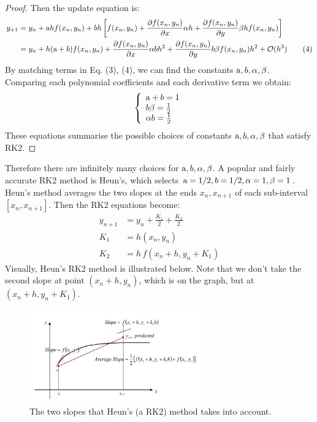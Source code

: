 \documentclass[a4paper]{article}
\begin{document}
\begin{proof}
Then the update equation is:
\begin{align*}
    y_{+1} &= y_n + \textup{a} h f(x_n, y_n) + b h \left[ f(x_n, y_n) + \frac{\partial f(x_n, y_n)}{\partial x} \alpha h + \frac{\partial f(x_n, y_n)}{\partial y} \beta h f(x_n, y_n) \right] \\
    &= y_n + h(\textup{a} + b) f(x_n, y_n) + \frac{\partial f(x_n, y_n)}{\partial x} \alpha b h^2 + \frac{\partial f(x_n, y_n)}{\partial y} b \beta f(x_n, y_n) h^2 + \mathcal{O}(h^3)
    \tag{4}
\end{align*}
By matching terms in Eq. (3), (4), we can find the constants $\textup{a}, b, \alpha, \beta$. Comparing each polynomial coefficients and each derivative term we obtain:
\[
    \left \{
        \begin{array}{l}
            \textup{a} + b = 1 \\
            b \beta = \frac{1}{2} \\
            \alpha b = \frac{1}{2}
        \end{array}
    \right.
\]
These equations summarise the possible choices of constants $\textup{a}, b, \alpha, \beta$ that satisfy RK2.
\end{proof}
Therefore there are infinitely many choices for $\textup{a}, b, \alpha, \beta$. A popular and fairly accurate RK2 method is Heun's, which selects $\textup{a} = 1/2, b=1/2, \alpha = 1, \beta = 1$. Heun's method averages the two slopes at the ends $x_n, x_{n+1}$ of each sub-interval $[x_n, x_{n+1}]$. Then the RK2 equations become:
\begin{align*}
    y_{n+1} &= y_n + \frac{K_1}{2} + \frac{K_2}{2} \\
    K_1 &= h(x_n,y_n) \\
    K_2 &= h\, f(x_n + h, y_n + K_1)
\end{align*}
Visually, Heun's RK2 method is illustrated below. Note that we don't take the second slope at point $(x_n+h, y_n)$, which is on the graph, but at $(x_n+h, y_n + K_1)$.
\begin{figure}[H]
    \centering
    \includegraphics[height=4cm]{img/rk/diagram_heun.png}
    \caption{The two slopes that Heun's (a RK2) method takes into account.}
\end{figure}
\end{document}
